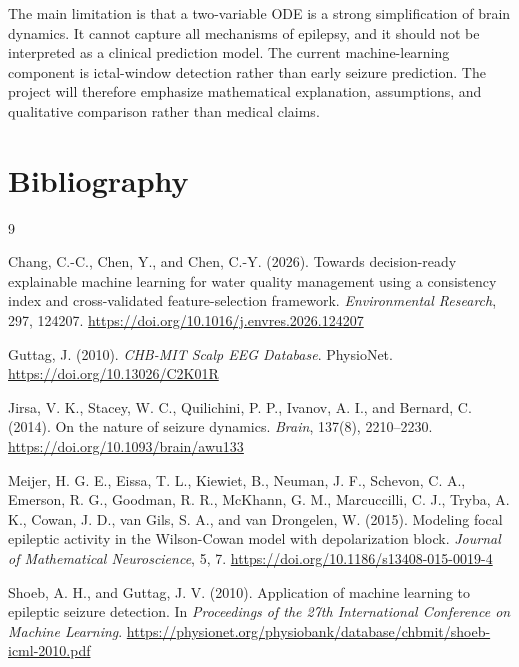 \documentclass[11pt]{article}
\begin{document}
The main limitation is that a two-variable ODE is a strong simplification of brain dynamics. It cannot capture all mechanisms of epilepsy, and it should not be interpreted as a clinical prediction model. The current machine-learning component is ictal-window detection rather than early seizure prediction. The project will therefore emphasize mathematical explanation, assumptions, and qualitative comparison rather than medical claims.

\section*{Bibliography}

\begin{thebibliography}{9}

Chang, C.-C., Chen, Y., and Chen, C.-Y. (2026).
Towards decision-ready explainable machine learning for water quality management using a consistency index and cross-validated feature-selection framework.
\textit{Environmental Research}, 297, 124207.
\url{https://doi.org/10.1016/j.envres.2026.124207}

Guttag, J. (2010).
\textit{CHB-MIT Scalp EEG Database}.
PhysioNet.
\url{https://doi.org/10.13026/C2K01R}

Jirsa, V. K., Stacey, W. C., Quilichini, P. P., Ivanov, A. I., and Bernard, C. (2014).
On the nature of seizure dynamics.
\textit{Brain}, 137(8), 2210--2230.
\url{https://doi.org/10.1093/brain/awu133}

Meijer, H. G. E., Eissa, T. L., Kiewiet, B., Neuman, J. F., Schevon, C. A., Emerson, R. G., Goodman, R. R., McKhann, G. M., Marcuccilli, C. J., Tryba, A. K., Cowan, J. D., van Gils, S. A., and van Drongelen, W. (2015).
Modeling focal epileptic activity in the Wilson-Cowan model with depolarization block.
\textit{Journal of Mathematical Neuroscience}, 5, 7.
\url{https://doi.org/10.1186/s13408-015-0019-4}

Shoeb, A. H., and Guttag, J. V. (2010).
Application of machine learning to epileptic seizure detection.
In \textit{Proceedings of the 27th International Conference on Machine Learning}.
\url{https://physionet.org/physiobank/database/chbmit/shoeb-icml-2010.pdf}

\end{thebibliography}
\end{document}
